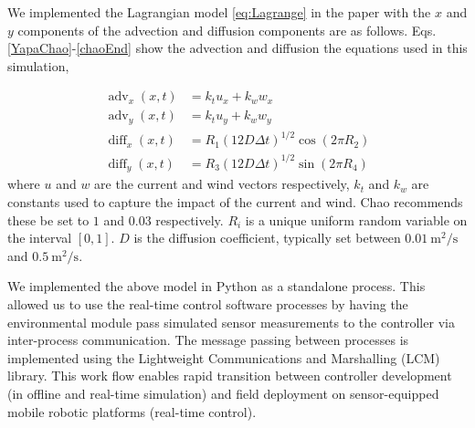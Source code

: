 \documentclass[ letterpaper, 10 pt, conference]{ieeeconf}  %
\DeclareMathOperator{\diff}{diff}
\DeclareMathOperator{\adv}{adv}
\begin{document}
We implemented the Lagrangian model \eqref{eq:Lagrange} in the paper with the $x$ and $y$ components of the advection and diffusion components are as follows.  Eqs. \eqref{YapaChao}-\eqref{chaoEnd} show the advection and diffusion the equations used in this simulation,   

\begin{align}
\adv_x{(x,t)}  &=k_t u_x + k_w w_x \label{YapaChao} \\
\adv_y{(x,t)} &=k_t u_y + k_w w_y \\		
\diff_x{(x,t)}  &= R_1  \left(12 D \Delta t \right)^{1/2}\cos(2\pi R_2) \label{dif3}\\
\diff_y{(x,t)}  &= R_3  \left(12 D \Delta t \right)^{1/2}\sin(2\pi R_4) \label{chaoEnd}
\end{align}
where $u$ and $w$ are the current and wind vectors respectively, $k_t$ and $k_w$ are constants used to capture the impact of the current and wind.  Chao recommends these be set to $1$ and $0.03$ respectively.  $R_i$ is a unique uniform random variable on the interval $[0,1]$.   $D$ is the diffusion coefficient, typically set between $0.01\  \mbox{m}^2/\mbox{s}$ and $0.5\ \mbox{m}^2/\mbox{s}$.

We implemented the above model in Python as a standalone process.  This allowed us to use the real-time control software processes by having the environmental module pass simulated sensor measurements to the controller via inter-process communication.  The message passing between processes is implemented using the Lightweight Communications and Marshalling (LCM) library\cite{Huang2010}.  This work flow enables rapid transition between controller development (in offline and real-time simulation) and field deployment on sensor-equipped mobile robotic platforms (real-time control).
\end{document}
